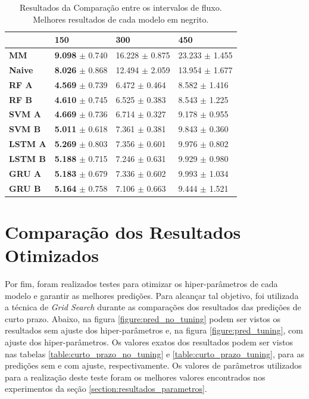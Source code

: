 \begin{table}[H]
    \begin{tabular*}{\linewidth}{@{\extracolsep{\fill}}llll}
    \toprule
     & 
    \multicolumn{1}{l}{\textbf{150}} & 
    \multicolumn{1}{l}{\textbf{300}} &
    \multicolumn{1}{l}{\textbf{450}} \\
    \midrule
    \textbf{MM} & \textbf{9.098} $\pm$ 0.740 & 16.228 $\pm$ 0.875 & 23.233 $\pm$ 1.455
    \\
    \midrule
    \textbf{Naive} & \textbf{8.026} $\pm$ 0.868 & 12.494 $\pm$ 2.059 & 13.954 $\pm$ 1.677
    \\
    \midrule
    \textbf{RF A} & \textbf{4.569} $\pm$ 0.739 & 6.472 $\pm$ 0.464 & 8.582 $\pm$ 1.416
    \\
    \midrule
    \textbf{RF B} & \textbf{4.610} $\pm$ 0.745 & 6.525 $\pm$ 0.383 & 8.543 $\pm$ 1.225
    \\
    \midrule
    \textbf{SVM A} & \textbf{4.669} $\pm$ 0.736 & 6.714 $\pm$ 0.327 & 9.178 $\pm$ 0.955
    \\
    \midrule
    \textbf{SVM B} & \textbf{5.011} $\pm$ 0.618 & 7.361 $\pm$ 0.381 & 9.843 $\pm$ 0.360
    \\
    \midrule
    \textbf{LSTM A} & \textbf{5.269} $\pm$ 0.803 & 7.356 $\pm$ 0.601 & 9.976 $\pm$ 0.802
    \\
    \midrule
    \textbf{LSTM B} & \textbf{5.188} $\pm$ 0.715 & 7.246 $\pm$ 0.631 & 9.929 $\pm$ 0.980
    \\
    \midrule
    \textbf{GRU A} & \textbf{5.183} $\pm$ 0.679 & 7.336 $\pm$ 0.602 & 9.993 $\pm$ 1.034
    \\
    \midrule
    \textbf{GRU B} & \textbf{5.164} $\pm$ 0.758 & 7.106 $\pm$ 0.663 & 9.444 $\pm$ 1.521
    \\
    \bottomrule
    \end{tabular*}
    \label{table:res_flow}
    \caption{Resultados da Comparação entre os intervalos de fluxo. Melhores resultados de cada modelo em negrito.}
\end{table}

\section{Comparação dos Resultados Otimizados}

 Por fim, foram realizados testes para otimizar os hiper-parâmetros de cada modelo e garantir as melhores predições. Para alcançar tal objetivo, foi utilizada a técnica de \textit{Grid Search} durante as comparações dos resultados das predições de curto prazo. Abaixo, na figura \ref{figure:pred_no_tuning} podem ser vistos os resultados sem ajuste dos hiper-parâmetros e, na figura \ref{figure:pred_tuning}, com ajuste dos hiper-parâmetros. Os valores exatos dos resultados podem ser vistos nas tabelas  \ref{table:curto_prazo_no_tuning} e \ref{table:curto_prazo_tuning}, para as predições sem e com ajuste, respectivamente. Os valores de parâmetros utilizados para a realização deste teste foram os melhores valores encontrados nos experimentos da seção \ref{section:resultados_parametros}.
 
